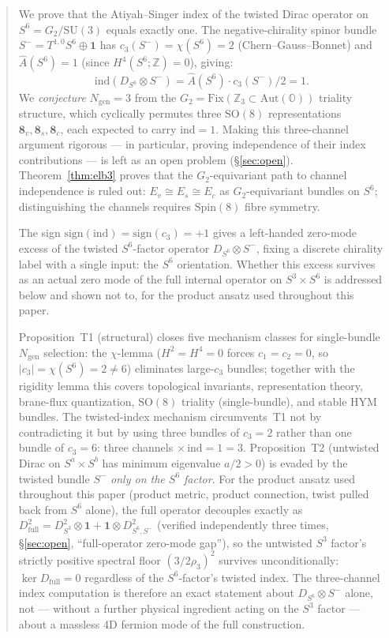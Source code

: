 \documentclass[12pt,a4paper]{article}
\newcommand{\ind}{\mathrm{ind}}
\newcommand{\OC}{\mathbb{O}}    %
\newcommand{\ZZ}{\mathbb{Z}}
\begin{document}
\begin{abstract}
We prove that the Atiyah--Singer index of the twisted Dirac operator on
$S^6 = G_2/\mathrm{SU}(3)$ equals exactly one. The negative-chirality spinor bundle
$S^- = T^{1,0}S^6 \oplus \mathbf{1}$ has $c_3(S^-)=\chi(S^6)=2$
(Chern--Gauss--Bonnet) and $\hat{A}(S^6)=1$ (since $H^4(S^6;\ZZ)=0$),
giving:
\[
  \ind(D_{S^6}\otimes S^-)=\hat{A}(S^6)\cdot c_3(S^-)/2=1.
\]
We \emph{conjecture} $N_{\mathrm{gen}}=3$ from the $G_2 =
\mathrm{Fix}(\ZZ_3\subset\mathrm{Aut}(\OC))$ triality structure, which cyclically
permutes three $\mathrm{SO}(8)$ representations $\mathbf{8}_v, \mathbf{8}_s,
\mathbf{8}_c$, each expected to carry $\ind=1$. Making this three-channel argument
rigorous --- in particular, proving independence of their index contributions ---
is left as an open problem (\S\ref{sec:open}).
Theorem~\ref{thm:elb3} proves that the $G_2$-equivariant path to channel independence
is ruled out: $E_v\cong E_s\cong E_c$ as $G_2$-equivariant bundles on $S^6$;
distinguishing the channels requires $\mathrm{Spin}(8)$ fibre symmetry.

The sign $\mathrm{sign}(\ind)=\mathrm{sign}(c_3)=+1$ gives a left-handed zero-mode
excess of the twisted $S^6$-factor operator $D_{S^6}\otimes S^-$, fixing a discrete
chirality label with a single input: the $S^6$ orientation. Whether this excess
survives as an actual zero mode of the full internal operator on $S^3\times S^6$ is
addressed below and shown not to, for the product ansatz used throughout this paper.

Proposition~T1 (structural) closes five mechanism classes for single-bundle
$N_{\mathrm{gen}}$ selection: the $\chi$-lemma ($H^2=H^4=0$ forces $c_1=c_2=0$,
so $|c_3|=\chi(S^6)=2\neq 6$) eliminates large-$c_3$ bundles; together with the
rigidity lemma this covers topological invariants, representation theory,
brane-flux quantization, $\mathrm{SO}(8)$ triality (single-bundle), and stable
HYM bundles. The twisted-index mechanism circumvents~T1 not by contradicting it
but by using three bundles of $c_3=2$ rather than one bundle of $c_3=6$:
three channels $\times\,\mathrm{ind}=1=3$. Proposition~T2 (untwisted Dirac on
$S^a\times S^b$ has minimum eigenvalue $a/2>0$) is evaded by the twisted bundle
$S^-$ \emph{only on the $S^6$ factor}. For the product ansatz used throughout this
paper (product metric, product connection, twist pulled back from $S^6$ alone),
the full operator decouples exactly as $D_{\mathrm{full}}^2 = D_{S^3}^2\otimes
\mathbf{1} + \mathbf{1}\otimes D_{S^6,S^-}^2$ (verified independently three times,
\S\ref{sec:open}, ``full-operator zero-mode gap''), so the untwisted $S^3$ factor's strictly positive
spectral floor $(3/2\rho_3)^2$ survives unconditionally: $\ker D_{\mathrm{full}}=0$
regardless of the $S^6$-factor's twisted index. The three-channel index computation
is therefore an exact statement about $D_{S^6}\otimes S^-$ alone, not --- without a
further physical ingredient acting on the $S^3$ factor --- about a massless 4D
fermion mode of the full construction.


\end{abstract}
\end{document}
